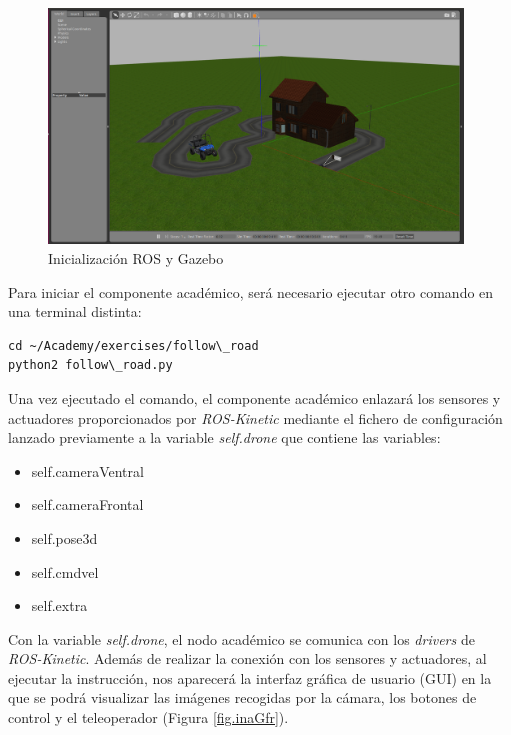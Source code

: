 \begin{figure}[H]
  \begin{center}
    \includegraphics[width=0.98\textwidth]{figures/roslaunch_fr.png}
		\caption{Inicialización ROS y Gazebo}
		\label{fig.roslaunchfr}
		\end{center}
\end{figure}

Para iniciar el componente académico, será necesario ejecutar otro comando en una terminal distinta:

\lstset{language=bash, breaklines=true, basicstyle=\footnotesize}
\begin{lstlisting}[frame=single]
cd ~/Academy/exercises/follow\_road
python2 follow\_road.py
\end{lstlisting}

Una vez ejecutado el comando, el componente académico enlazará los sensores y actuadores proporcionados por \textit{ROS-Kinetic} mediante el fichero de configuración lanzado previamente a la variable \textit{self.drone} que contiene las variables:

\begin{itemize}
    \item self.cameraVentral
    \item self.cameraFrontal
    \item self.pose3d
    \item self.cmdvel
    \item self.extra
\end{itemize}

Con la variable \textit{self.drone}, el nodo académico se comunica con los \textit{drivers} de \textit{ROS-Kinetic}.
Además de realizar la conexión con los sensores y actuadores, al ejecutar la instrucción, nos aparecerá la interfaz gráfica de usuario (GUI) en la que se podrá visualizar las imágenes recogidas por la cámara, los botones de control y el teleoperador (Figura \ref{fig.inaGfr}).

